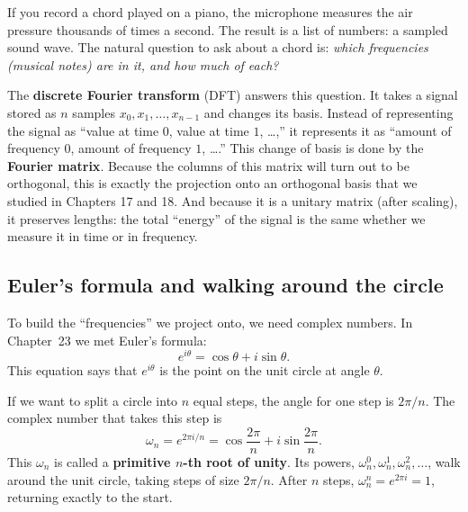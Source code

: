 If you record a chord played on a piano, the microphone measures the air pressure thousands of times a second. The result is a list of numbers: a sampled sound wave. The natural question to ask about a chord is: \emph{which frequencies (musical notes) are in it, and how much of each?}

The \textbf{discrete Fourier transform} (DFT) answers this question. It takes a signal stored as $n$ samples $x_0, x_1, \dots, x_{n-1}$ and changes its basis. Instead of representing the signal as ``value at time $0$, value at time $1$, \dots,'' it represents it as ``amount of frequency $0$, amount of frequency $1$, \dots.'' This change of basis is done by the \textbf{Fourier matrix}. Because the columns of this matrix will turn out to be orthogonal, this is exactly the projection onto an orthogonal basis that we studied in Chapters 17 and 18. And because it is a unitary matrix (after scaling), it preserves lengths: the total ``energy'' of the signal is the same whether we measure it in time or in frequency.

\subsection{Euler's formula and walking around the circle}

To build the ``frequencies'' we project onto, we need complex numbers. In Chapter~23 we met Euler's formula:
\[
  e^{i\theta} = \cos\theta + i\sin\theta.
\]
This equation says that $e^{i\theta}$ is the point on the unit circle at angle $\theta$.

If we want to split a circle into $n$ equal steps, the angle for one step is $2\pi/n$. The complex number that takes this step is
\[
  \omega_n = e^{2\pi i / n} = \cos\frac{2\pi}{n} + i\sin\frac{2\pi}{n}.
\]
This $\omega_n$ is called a \textbf{primitive $n$-th root of unity}. Its powers, $\omega_n^0, \omega_n^1, \omega_n^2, \dots$, walk around the unit circle, taking steps of size $2\pi/n$. After $n$ steps, $\omega_n^n = e^{2\pi i} = 1$, returning exactly to the start.

